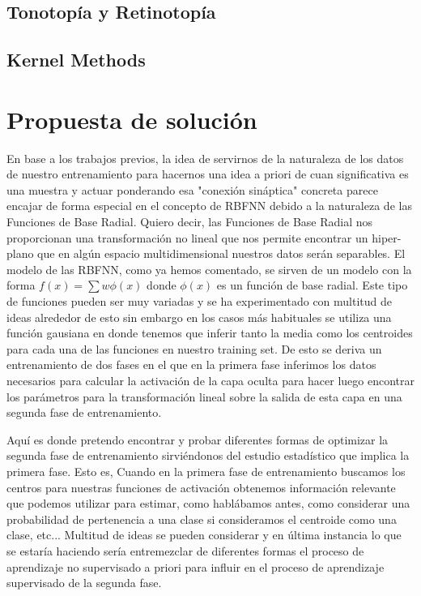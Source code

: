 \documentclass[10pt,a4paper]{report}
\begin{document}
\subsection{Tonotopía y Retinotopía}
\subsection{Kernel Methods}
\section{Propuesta de solución}
En base a los trabajos previos, la idea de servirnos de la naturaleza de los datos de nuestro entrenamiento para hacernos una idea a priori de cuan significativa es una muestra y actuar ponderando esa "conexión sináptica" concreta parece encajar de forma especial en el concepto de RBFNN debido a la naturaleza de las Funciones de Base Radial. Quiero decir, las Funciones de Base Radial nos proporcionan una transformación no lineal que nos permite encontrar un hiper-plano que en algún espacio multidimensional nuestros datos serán separables. El modelo de las RBFNN, como ya hemos comentado, se sirven de un modelo con la forma $f(x)=\sum w \phi(x)$ donde $\phi(x)$ es un función de base radial. Este tipo de funciones pueden ser muy variadas y se ha experimentado con multitud de ideas alrededor de esto sin embargo en los casos más habituales se utiliza una función gausiana en donde tenemos que inferir tanto la media como los centroides para cada una de las funciones en nuestro training set. De esto se deriva un entrenamiento de dos fases en el que en la primera fase inferimos los datos necesarios para calcular la activación de la capa oculta para hacer luego encontrar los parámetros para la transformación lineal sobre la salida de esta capa en una segunda fase de entrenamiento.

Aquí es donde pretendo encontrar y probar diferentes formas de optimizar la segunda fase de entrenamiento sirviéndonos del estudio estadístico que implica la primera fase. Esto es, Cuando en la primera fase de entrenamiento buscamos los centros para nuestras funciones de activación obtenemos información relevante que podemos utilizar para estimar, como hablábamos antes, como considerar una probabilidad de pertenencia a una clase si consideramos el centroide como una clase, etc... Multitud de ideas se pueden considerar y en última instancia lo que se estaría haciendo sería entremezclar de diferentes formas el proceso de aprendizaje no supervisado a priori para influir en el proceso de aprendizaje supervisado de la segunda fase.
\end{document}
